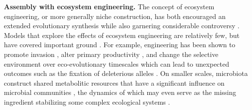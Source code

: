\documentclass[twocolumn,preprintnumbers,amsmath,amssymb,superscriptaddress,linenumbers]{revtex4-1}
\begin{document}
\vspace{0mm}
\noindent \textbf{Assembly with ecosystem engineering.}
The concept of ecosystem engineering, or more generally niche construction, has both encouraged an extended evolutionary synthesis \cite{Laland2015} while also garnering considerable controversy \cite{Gupta2017,Feldman2017}.
Models that explore the effects of ecosystem engineering are relatively few, but have covered important ground \cite{Hastings2007,OdlingSmee2013}.
For example, engineering has been shown to promote invasion \cite{Cuddington2004}, alter primary productivity \cite{Wright2004}, and change the selective environment over eco-evolutionary timescales \cite{Kylafis2008,Krakauer2009} which can lead to unexpected outcomes such as the fixation of deleterious alleles \cite{Laland1999}.
On smaller scales, microbiota construct shared metabolitic resources that have a significant influence on microbial communities \cite{Kallus2017}, the dynamics of which may even serve as the missing ingredient stabilizing some complex ecological systems \cite{Butler2018}.
\end{document}
